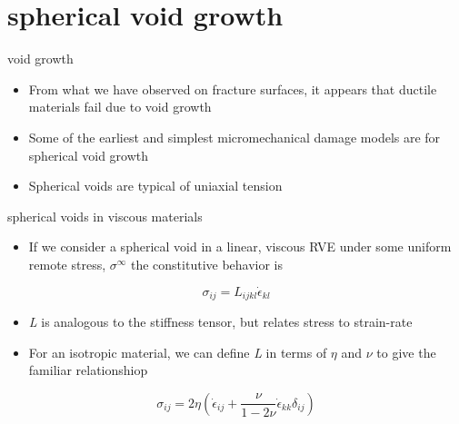 \documentclass[
  letterpaper,
  ignorenonframetext,
  aspectratio=43,
  handout,
  12pt]{beamer}
\providecommand{\tightlist}{%
  \setlength{\itemsep}{0pt}\setlength{\parskip}{0pt}}
\providecommand{\tightlist}{%
\setlength{\itemsep}{0pt}\setlength{\parskip}{0pt}}
\begin{document}
\hypertarget{spherical-void-growth}{%
\section{spherical void growth}\label{spherical-void-growth}}

\begin{frame}{void growth}
\protect\hypertarget{void-growth}{}
\begin{itemize}
\tightlist
\item
  From what we have observed on fracture surfaces, it appears that
  ductile materials fail due to void growth
\item
  Some of the earliest and simplest micromechanical damage models are
  for spherical void growth
\item
  Spherical voids are typical of uniaxial tension
\end{itemize}
\end{frame}

\begin{frame}{spherical voids in viscous materials}
\protect\hypertarget{spherical-voids-in-viscous-materials}{}
\begin{itemize}
\tightlist
\item
  If we consider a spherical void in a linear, viscous RVE under some
  uniform remote stress, \(\sigma^\infty\) the constitutive behavior is
\end{itemize}

\[\sigma_{ij} = L_{ijkl}\dot{\epsilon}_{kl}\]

\begin{itemize}
\tightlist
\item
  \emph{L} is analogous to the stiffness tensor, but relates stress to
  strain-rate
\item
  For an isotropic material, we can define \emph{L} in terms of \(\eta\)
  and \(\nu\) to give the familiar relationshiop
\end{itemize}

\[\sigma_{ij} = 2\eta \left(\dot{\epsilon}_{ij}+\frac{\nu}{1-2\nu} \dot{\epsilon}_{kk}\delta_{ij}\right)\]
\end{frame}
\end{document}
